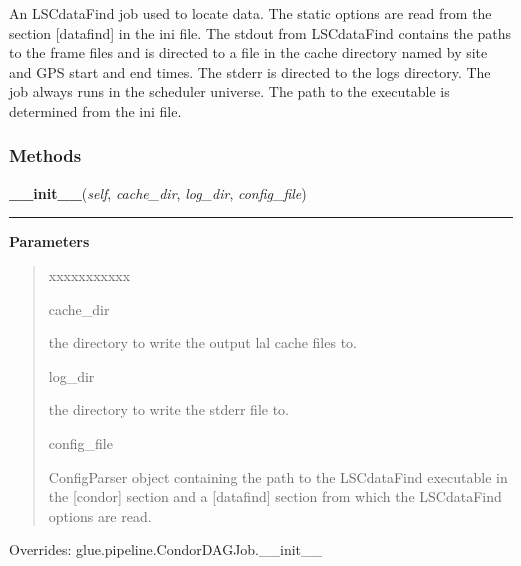 An LSCdataFind job used to locate data. The static options are read from 
the section [datafind] in the ini file. The stdout from LSCdataFind 
contains the paths to the frame files and is directed to a file in the 
cache directory named by site and GPS start and end times. The stderr is 
directed to the logs directory. The job always runs in the scheduler 
universe. The path to the executable is determined from the ini file.



  \subsubsection{Methods}

    \label{stochastic:LSCDataFindJob:__init__}
    \vspace{0.5ex}

    \begin{boxedminipage}{\textwidth}

    \raggedright \textbf{\_\_init\_\_}(\textit{self}, \textit{cache\_dir}, \textit{log\_dir}, \textit{config\_file})

    \vspace{-1.5ex}

    \rule{\textwidth}{0.5\fboxrule}
    \vspace{1ex}

      \textbf{Parameters}
      \begin{quote}
        \begin{Ventry}{xxxxxxxxxxx}

          \item[cache\_dir]

          the directory to write the output lal cache files to.

          \item[log\_dir]

          the directory to write the stderr file to.

          \item[config\_file]

          ConfigParser object containing the path to the LSCdataFind 
          executable in the [condor] section and a [datafind] section 
          from which the LSCdataFind options are read.

        \end{Ventry}

      \end{quote}

    \vspace{1ex}

      Overrides: glue.pipeline.CondorDAGJob.\_\_init\_\_

    \end{boxedminipage}

